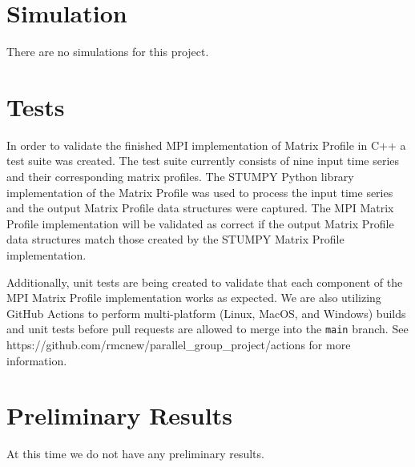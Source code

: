 \documentclass[conference]{IEEEtran}
\begin{document}
\section{Simulation}
There are no simulations for this project.

\section{Tests}
In order to validate the finished MPI implementation of Matrix Profile in C++ a test suite was created.  The test suite currently consists of nine input time series and their corresponding matrix profiles.  The STUMPY\cite{Stumpy} Python library implementation of the Matrix Profile was used to process the input time series and the output Matrix Profile data structures were captured.  The MPI Matrix Profile implementation will be validated as correct if the output Matrix Profile data structures match those created by the STUMPY Matrix Profile implementation. 

Additionally, unit tests are being created to validate that each component of the MPI Matrix Profile implementation works as expected.  We are also utilizing GitHub Actions to perform  multi-platform (Linux, MacOS, and Windows) builds and unit tests before pull requests are allowed to merge into the \texttt{main} branch.  See https://github.com/rmcnew/parallel\_group\_project/actions for more information.


\section{Preliminary Results}
At this time we do not have any preliminary results.  


\end{document}
